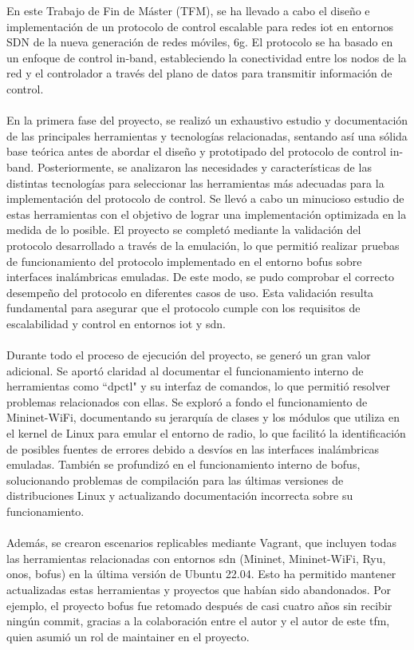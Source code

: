 En este Trabajo de Fin de Máster (TFM), se ha llevado a cabo el diseño e implementación de un protocolo de control escalable para redes \gls{iot} en entornos SDN de la nueva generación de redes móviles, \gls{6g}. El protocolo se ha basado en un enfoque de control in-band, estableciendo la conectividad entre los nodos de la red y el controlador a través del plano de datos para transmitir información de control.\\
\\
En la primera fase del proyecto, se realizó un exhaustivo estudio y documentación de las principales herramientas y tecnologías relacionadas, sentando así una sólida base teórica antes de abordar el diseño y prototipado del protocolo de control in-band. Posteriormente, se analizaron las necesidades y características de las distintas tecnologías para seleccionar las herramientas más adecuadas para la implementación del protocolo de control. Se llevó a cabo un minucioso estudio de estas herramientas con el objetivo de lograr una implementación optimizada en la medida de lo posible.  El proyecto se completó mediante la validación del protocolo desarrollado a través de la emulación, lo que permitió realizar pruebas de funcionamiento del protocolo implementado en el entorno \gls{bofus} sobre interfaces inalámbricas emuladas. De este modo, se pudo comprobar el correcto desempeño del protocolo en diferentes casos de uso. Esta validación resulta fundamental para asegurar que el protocolo cumple con los requisitos de escalabilidad y control en entornos \gls{iot} y \gls{sdn}.\\
\\
Durante todo el proceso de ejecución del proyecto, se generó un gran valor adicional. Se aportó claridad al documentar el funcionamiento interno de herramientas como ``dpctl" y su interfaz de comandos, lo que permitió resolver problemas relacionados con ellas. Se exploró a fondo el funcionamiento de Mininet-WiFi, documentando su jerarquía de clases y los módulos que utiliza en el kernel de Linux para emular el entorno de radio, lo que facilitó la identificación de posibles fuentes de errores debido a desvíos en las interfaces inalámbricas emuladas. También se profundizó en el funcionamiento interno de \gls{bofus}, solucionando problemas de compilación para las últimas versiones de distribuciones Linux y actualizando documentación incorrecta sobre su funcionamiento.\\
\\
Además, se crearon escenarios replicables mediante Vagrant, que incluyen todas las herramientas relacionadas con entornos \gls{sdn} (Mininet, Mininet-WiFi, Ryu, \gls{onos}, \gls{bofus}) en la última versión de Ubuntu 22.04. Esto ha permitido mantener actualizadas estas herramientas y proyectos que habían sido abandonados. Por ejemplo, el proyecto \gls{bofus} fue retomado después de casi cuatro años sin recibir ningún commit, gracias a la colaboración entre el autor y el autor de este \gls{tfm}, quien asumió un rol de maintainer en el proyecto.\\
